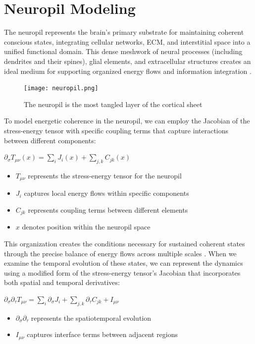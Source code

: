 \section{Neuropil Modeling}

The neuropil represents the brain's primary substrate for maintaining coherent conscious states, integrating cellular networks, ECM, and interstitial space into a unified functional domain. This dense meshwork of neural processes (including dendrites and their spines), glial elements, and extracellular structures creates an ideal medium for supporting organized energy flows and information integration \cite{Kasthuri2015}.

\begin{figure}[h]
    \centering
    \texttt{[image: neuropil.png]}

    \caption{The neuropil is the most tangled layer of the cortical sheet}
\end{figure}

To model energetic coherence in the neuropil, we can employ the Jacobian of the stress-energy tensor with specific coupling terms that capture interactions between different components:

$\partial_\sigma T_{\mu\nu}(x) = \sum_i J_i(x) + \sum_{j,k} C_{jk}(x)$

\begin{itemize}
\item $T_{\mu\nu}$ represents the stress-energy tensor for the neuropil
\item $J_i$ captures local energy flows within specific components
\item $C_{jk}$ represents coupling terms between different elements
\item $x$ denotes position within the neuropil space
\end{itemize}

This organization creates the conditions necessary for sustained coherent states through the precise balance of energy flows across multiple scales \cite{Mishchenko2010}. When we examine the temporal evolution of these states, we can represent the dynamics using a modified form of the stress-energy tensor's Jacobian that incorporates both spatial and temporal derivatives:

$\partial_\sigma\partial_\tau T_{\mu\nu} = \sum_i \partial_\sigma J_i + \sum_{j,k} \partial_\tau C_{jk} + I_{\mu\nu}$

\begin{itemize}
\item $\partial_\sigma\partial_\tau$ represents the spatiotemporal evolution
\item $I_{\mu\nu}$ captures interface terms between adjacent regions
\end{itemize}

